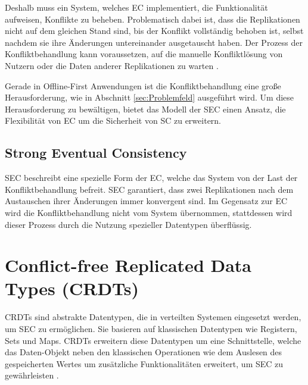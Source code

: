 \documentclass[a4paper, 12pt]{scrreprt}
\begin{document}
Deshalb muss ein System, welches \ac{EC} implementiert, die Funktionalität aufweisen, Konflikte zu beheben. Problematisch dabei ist, dass die Replikationen nicht auf dem gleichen Stand sind, bis der Konflikt vollständig behoben ist, selbst nachdem sie ihre Änderungen untereinander ausgetauscht haben. Der Prozess der Konfliktbehandlung kann voraussetzen, auf die manuelle Konfliktlösung von Nutzern oder die Daten anderer Replikationen zu warten \autocite{ArticleEventualConsistencyConflicts}.

Gerade in Offline-First Anwendungen ist die Konfliktbehandlung eine große Herausforderung, wie in Abschnitt \ref{sec:Problemfeld} ausgeführt wird. Um diese Herausforderung zu bewältigen, bietet das Modell der \acf{SEC} einen Ansatz, die Flexibilität von \ac{EC} um die Sicherheit von \ac{SC} zu erweitern. 




\subsection{Strong Eventual Consistency}


\ac{SEC} beschreibt eine spezielle Form der \acf{EC}, welche das System von der Last der Konfliktbehandlung befreit. \ac{SEC} garantiert, dass zwei Replikationen nach dem Austauschen ihrer Änderungen immer konvergent sind. Im Gegensatz zur \ac{EC} wird die Konfliktbehandlung nicht vom System übernommen, stattdessen wird dieser Prozess durch die Nutzung spezieller Datentypen überflüssig. 


\section{Conflict-free Replicated Data Types (CRDTs)}
\label{sec:CRDTs}

\acp{CRDT} sind abstrakte Datentypen, die in verteilten Systemen eingesetzt werden, um \ac{SEC} zu ermöglichen. Sie basieren auf klassischen Datentypen wie Registern, Sets und Maps. \acp{CRDT} erweitern diese Datentypen um eine Schnittstelle, welche das Daten-Objekt neben den klassischen Operationen wie dem Auslesen des gespeicherten Wertes um zusätzliche Funktionalitäten erweitert, um \ac{SEC} zu gewährleisten \autocite[S.~1]{ArticleCRDTOverview}. 
\end{document}
